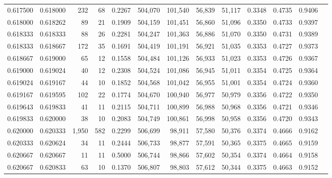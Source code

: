 \begin{tabular}{rrrrrrrrrrrrr}
0.617500 & 0.618000 &   232 &  68 &                                     0.2267 & 504,070 & 101,540 &  56,839 &  51,117 & 0.3348 & 0.4735 & 0.9406 \\
0.618000 & 0.618262 &    89 &  21 &                                     0.1909 & 504,159 & 101,451 &  56,860 &  51,096 & 0.3350 & 0.4733 & 0.9397 \\
0.618333 & 0.618333 &    88 &  26 &                                     0.2281 & 504,247 & 101,363 &  56,886 &  51,070 & 0.3350 & 0.4731 & 0.9389 \\
0.618333 & 0.618667 &   172 &  35 &                                     0.1691 & 504,419 & 101,191 &  56,921 &  51,035 & 0.3353 & 0.4727 & 0.9373 \\
0.618667 & 0.619000 &    65 &  12 &                                     0.1558 & 504,484 & 101,126 &  56,933 &  51,023 & 0.3353 & 0.4726 & 0.9367 \\
0.619000 & 0.619024 &    40 &  12 &                                     0.2308 & 504,524 & 101,086 &  56,945 &  51,011 & 0.3354 & 0.4725 & 0.9364 \\
0.619024 & 0.619167 &    44 &  10 &                                     0.1852 & 504,568 & 101,042 &  56,955 &  51,001 & 0.3354 & 0.4724 & 0.9360 \\
0.619167 & 0.619595 &   102 &  22 &                                     0.1774 & 504,670 & 100,940 &  56,977 &  50,979 & 0.3356 & 0.4722 & 0.9350 \\
0.619643 & 0.619833 &    41 &  11 &                                     0.2115 & 504,711 & 100,899 &  56,988 &  50,968 & 0.3356 & 0.4721 & 0.9346 \\
0.619833 & 0.620000 &    38 &  10 &                                     0.2083 & 504,749 & 100,861 &  56,998 &  50,958 & 0.3356 & 0.4720 & 0.9343 \\
0.620000 & 0.620333 & 1,950 & 582 &                                     0.2299 & 506,699 &  98,911 &  57,580 &  50,376 & 0.3374 & 0.4666 & 0.9162 \\
0.620333 & 0.620624 &    34 &  11 &                                     0.2444 & 506,733 &  98,877 &  57,591 &  50,365 & 0.3375 & 0.4665 & 0.9159 \\
0.620667 & 0.620667 &    11 &  11 &                                     0.5000 & 506,744 &  98,866 &  57,602 &  50,354 & 0.3374 & 0.4664 & 0.9158 \\
0.620667 & 0.620833 &    63 &  10 &                                     0.1370 & 506,807 &  98,803 &  57,612 &  50,344 & 0.3375 & 0.4663 & 0.9152 \\

\end{tabular}
